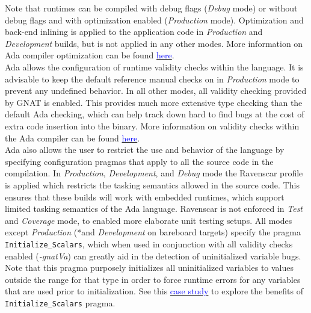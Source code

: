 Note that runtimes can be compiled with debug flags (\textit{Debug} mode) or without debug flags and with optimization enabled (\textit{Production} mode). Optimization and back-end inlining is applied to the application code in \textit{Production} and \textit{Development} builds, but is not applied in any other modes. More information on Ada compiler optimization can be found \href{https://gcc.gnu.org/onlinedocs/gcc-4.6.2/gnat_ugn_unw/Switches-for-gcc.html}{\textcolor{blue}{here}}. \\

Ada allows the configuration of runtime validity checks within the language. It is advisable to keep the default reference manual checks on in \textit{Production} mode to prevent any undefined behavior. In all other modes, all validity checking provided by GNAT is enabled. This provides much more extensive type checking than the default Ada checking, which can help track down hard to find bugs at the cost of extra code insertion into the binary. More information on validity checks within the Ada compiler can be found \href{https://gcc.gnu.org/onlinedocs/gcc-4.6.2/gnat_ugn_unw/Validity-Checking.html#Validity-Checking}{\textcolor{blue}{here}}. \\

Ada also allows the user to restrict the use and behavior of the language by specifying configuration pragmas that apply to all the source code in the compilation. In \textit{Production}, \textit{Development}, and \textit{Debug} mode the Ravenscar profile is applied which restricts the tasking semantics allowed in the source code. This ensures that these builds will work with embedded runtimes, which support limited tasking semantics of the Ada language. Ravenscar is not enforced in \textit{Test} and \textit{Coverage} mode, to enabled more elaborate unit testing setups. All modes except \textit{Production} (*and \textit{Development} on bareboard targets) specify the pragma \texttt{Initialize\_Scalars}, which when used in conjunction with all validity checks enabled (\textit{-gnatVa}) can greatly aid in the detection of uninitialized variable bugs. Note that this pragma purposely initializes all uninitialized variables to values outside the range for that type in order to force runtime errors for any variables that are used prior to initialization. See this \href{https://www.adacore.com/uploads/techPapers/rtchecks.pdf}{\textcolor{blue}{case study}} to explore the benefits of \texttt{Initialize\_Scalars} pragma. \\

